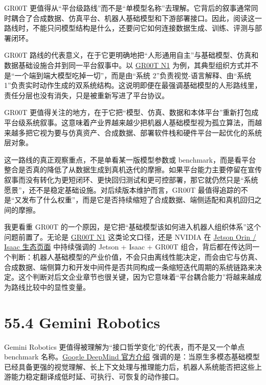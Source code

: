 GR00T 更值得从“平台级路线”而不是“单模型名称”去理解。它背后的叙事通常同时耦合了合成数据、仿真平台、机器人基础模型和下游部署接口。因此，阅读这一路线时，不能只问模型结构是什么，还要问它如何连接数据生成、训练、评测与部署闭环。

GR00T 路线的代表意义，在于它更明确地把“人形通用自主”与基础模型、仿真和数据基础设施合并到同一平台叙事中。以 \href{https://arxiv.org/abs/2503.14734}{GR00T N1} 为例，其典型组织方式并不是“一个端到端大模型吃掉一切”，而是由“系统 2”负责视觉-语言解释、由“系统 1”负责实时动作生成的双系统结构。这说明即便在最强调基础模型的人形路线里，责任分层也没有消失，只是被重新写进了平台协议。

GR00T 更值得关注的地方，在于它把“模型、仿真、数据和本体平台”重新打包成平台级系统叙事。这意味着产业界越来越少把机器人基础模型视为孤立算法，而越来越多把它视为要与仿真资产、合成数据、部署软件栈和硬件平台一起优化的系统层对象。

这一路线的真正观察重点，不是单看某一版模型参数或 benchmark，而是看平台整合是否真的降低了从数据生成到真机迭代的摩擦。如果平台能力主要停留在宣传叙事而没有转化为更短闭环、更快回归测试和更可控部署，那它就仍然只是“系统愿景”，还不是稳定基础设施。对后续版本维护而言，GR00T 最值得追踪的不是“又发布了什么权重”，而是它是否持续缩短了合成数据、端侧适配和真机回归之间的摩擦。

我更看重 GR00T 的一个原因，是它把“基础模型该如何进入机器人组织体系”这个问题前置了。无论是 \href{https://arxiv.org/abs/2503.14734}{GR00T N1} 这类论文口径，还是 NVIDIA 在 \href{https://www.nvidia.com/en-us/autonomous-machines/embedded-systems/jetson-orin/}{Jetson Orin / Isaac 生态页面} 中持续强调的 Jetson + Isaac + GR00T 组合，背后都在传达同一个判断：机器人基础模型的产业价值，不会只由离线性能决定，而会由它与仿真、合成数据、端侧算力和开发中间件是否共同构成一条缩短迭代周期的系统链路来决定。这个判断对后文企业章节也很关键，因为它意味着“平台耦合能力”将越来越成为路线比较中的显性变量。

\section*{55.4 Gemini Robotics}


Gemini Robotics 更值得被理解为“接口哲学变化”的代表，而不是又一个单点 benchmark 名称。\href{https://deepmind.google/discover/blog/gemini-robotics-brings-ai-into-the-physical-world/}{Google DeepMind 官方介绍} 强调的是：当原生多模态基础模型已经具备更强的视觉理解、长上下文处理与推理能力后，机器人系统能否把这些上游能力稳定翻译成低时延、可执行、可恢复的动作接口。


